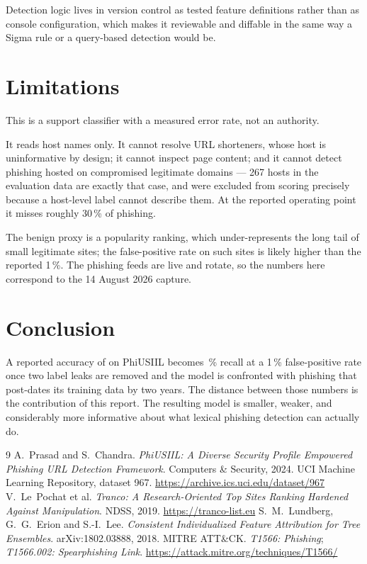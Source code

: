 \documentclass[11pt,a4paper]{article}
\begin{document}
Detection logic lives in version control as tested feature definitions rather than as console
configuration, which makes it reviewable and diffable in the same way a Sigma rule or a query-based
detection would be.

\section{Limitations}

This is a support classifier with a measured error rate, not an authority.

It reads host names only. It cannot resolve URL shorteners, whose host is uninformative by design;
it cannot inspect page content; and it cannot detect phishing hosted on compromised legitimate
domains --- 267 hosts in the evaluation data are exactly that case, and were excluded from scoring
precisely because a host-level label cannot describe them. At the reported operating point it misses
roughly 30\,\% of phishing.

The benign proxy is a popularity ranking, which under-represents the long tail of small legitimate
sites; the false-positive rate on such sites is likely higher than the reported 1\,\%. The phishing
feeds are live and rotate, so the numbers here correspond to the 14 August 2026 capture.

\section{Conclusion}

A reported accuracy of \FullAcc{} on PhiUSIIL becomes \OodRecall\,\% recall at a 1\,\%
false-positive rate once two label leaks are removed and the model is confronted with phishing that
post-dates its training data by two years. The distance between those numbers is the contribution of
this report. The resulting model is smaller, weaker, and considerably more informative about what
lexical phishing detection can actually do.

\begin{thebibliography}{9}
 A.~Prasad and S.~Chandra. \emph{PhiUSIIL: A Diverse Security Profile Empowered
Phishing URL Detection Framework}. Computers \& Security, 2024. UCI Machine Learning Repository,
dataset 967. \url{https://archive.ics.uci.edu/dataset/967}
 V.~Le~Pochat et al. \emph{Tranco: A Research-Oriented Top Sites Ranking Hardened
Against Manipulation}. NDSS, 2019. \url{https://tranco-list.eu}
 S.~M.~Lundberg, G.~G.~Erion and S.-I.~Lee. \emph{Consistent Individualized
Feature Attribution for Tree Ensembles}. arXiv:1802.03888, 2018.
 MITRE ATT\&CK. \emph{T1566: Phishing}; \emph{T1566.002: Spearphishing Link}.
\url{https://attack.mitre.org/techniques/T1566/}
\end{thebibliography}
\end{document}
